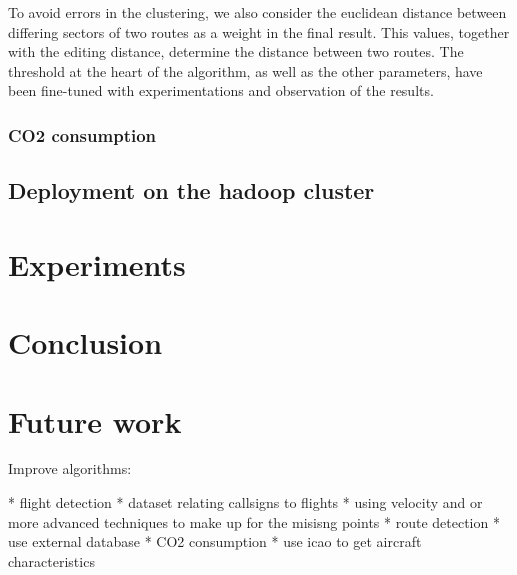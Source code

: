 \documentclass{vldb}
\begin{document}
To avoid errors in the clustering, we also consider the euclidean distance
between differing sectors of two routes as a weight in the final result. This
values, together with the editing distance, determine the distance between two
routes. The threshold at the heart of the algorithm, as well as the other
parameters, have been fine-tuned with experimentations and
observation of the results.

\subsubsection{CO2 consumption}


\subsection{Deployment on the hadoop cluster}


\section{Experiments}






\section{Conclusion}


\section{Future work}

Improve algorithms:

* flight detection
  * dataset relating callsigns to flights
  * using velocity and or more advanced techniques to make up for the misisng points
* route detection
  * use external database
* CO2 consumption
  * use icao to get aircraft characteristics
\end{document}
